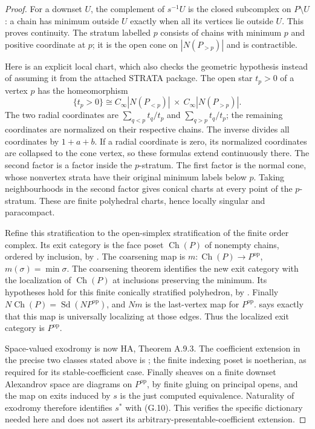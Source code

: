 \begin{proof}
For a downset $U$, the complement of $s^{-1}U$ is the closed
subcomplex on $P\setminus U$: a chain has minimum outside $U$
exactly when all its vertices lie outside $U$. This proves
continuity. The stratum labelled $p$ consists of chains with
minimum $p$ and positive coordinate at $p$; it is the open cone
on $|N(P_{>p})|$ and is contractible.

Here is an explicit local chart, which also checks the geometric
hypothesis instead of assuming it from the attached STRATA package.
The open star $t_p>0$ of a vertex $p$ has the homeomorphism
\[
 \{t_p>0\}\cong
 C_\infty|N(P_{<p})|\ \times\ C_\infty|N(P_{>p})|.
\tag{G.10a}
\]
The two radial coordinates are
$\sum_{q<p}t_q/t_p$ and $\sum_{q>p}t_q/t_p$; the remaining
coordinates are normalized on their respective chains. The inverse
divides all coordinates by $1+a+b$. If a radial coordinate is zero,
its normalized coordinates are collapsed to the cone vertex, so
these formulas extend continuously there. The second factor is a
factor inside the $p$-stratum. The first factor is the normal cone,
whose nonvertex strata have their original minimum labels below
$p$. Taking neighbourhoods in the second factor gives conical charts
at every point of the $p$-stratum. These are finite polyhedral
charts, hence locally singular and paracompact.

Refine this stratification to the open-simplex stratification of the
finite order complex. Its exit category is the face poset
$\operatorname{Ch}(P)$ of nonempty chains, ordered by inclusion,
by \citet[Theorem A.6.10]{DGLurieHA}. The coarsening map is
$m:\operatorname{Ch}(P)\to P^{\mathrm{op}}$,
$m(\sigma)=\min\sigma$. The coarsening theorem
\citet[Theorem 3.3.5]{DGHPT2026} identifies the new exit category
with the localization of $\operatorname{Ch}(P)$ at inclusions
preserving the minimum. Its hypotheses hold for this finite
conically stratified polyhedron, by
\citet[Theorems A.6.4 and A.9.3]{DGLurieHA}.
Finally $N\operatorname{Ch}(P)=\operatorname{Sd}(NP^{\mathrm{op}})$,
and $Nm$ is the last-vertex map for $P^{\mathrm{op}}$.
\citet[Proposition 6.3.6.2]{DGKerodonSubdivision} says exactly that
this map is universally localizing at those edges. Thus the
localized exit category is $P^{\mathrm{op}}$.

Space-valued exodromy is now HA, Theorem A.9.3. The coefficient
extension in the precise two classes stated above is
\citet[Corollary 4.1.15]{DGHPT2026}; the finite indexing poset is
noetherian, as required for its stable-coefficient case. Finally
sheaves on a finite downset Alexandrov space are diagrams on
$P^{\mathrm{op}}$, by finite gluing on principal opens, and the
map on exits induced by $s$ is the just computed equivalence.
Naturality of exodromy therefore identifies $s^*$ with (G.10).
This verifies the specific dictionary needed here and does not
assert its arbitrary-presentable-coefficient extension.
\end{proof}

